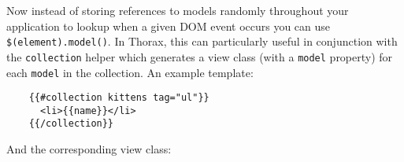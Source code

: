 \documentclass[9pt]{book}
\newenvironment{Shaded}{}{}
\newcommand{\KeywordTok}[1]{\textcolor[rgb]{0.00,0.44,0.13}{\textbf{{#1}}}}
\newcommand{\StringTok}[1]{\textcolor[rgb]{0.25,0.44,0.63}{{#1}}}
\newcommand{\OtherTok}[1]{\textcolor[rgb]{0.00,0.44,0.13}{{#1}}}
\newcommand{\FunctionTok}[1]{\textcolor[rgb]{0.02,0.16,0.49}{{#1}}}
\newcommand{\NormalTok}[1]{{#1}}
\begin{document}
\begin{Shaded}
\end{Shaded}

Now instead of storing references to models randomly throughout your
application to lookup when a given DOM event occurs you can use
\texttt{\$(element).model()}. In Thorax, this can particularly useful in
conjunction with the \texttt{collection} helper which generates a view
class (with a \texttt{model} property) for each \texttt{model} in the
collection. An example template:

\begin{verbatim}
    {{#collection kittens tag="ul"}}
      <li>{{name}}</li>
    {{/collection}}
\end{verbatim}

And the corresponding view class:
\end{document}
